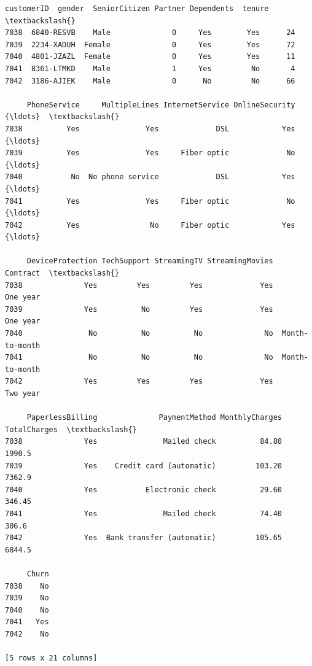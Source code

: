 \documentclass[11pt]{article}
\makeatletter
\newcommand{\boxspacing}{\kern\kvtcb@left@rule\kern\kvtcb@boxsep}
\newcommand{\prompt}[4]{
        {\ttfamily\llap{{\color{#2}[#3]:\hspace{3pt}#4}}\vspace{-\baselineskip}}
    }
\makeatother
\begin{document}
            \begin{tcolorbox}[breakable, size=fbox, boxrule=.5pt, pad at break*=1mm, opacityfill=0]
\prompt{Out}{outcolor}{184}{\boxspacing}
\begin{Verbatim}[commandchars=\\\{\}]
      customerID  gender  SeniorCitizen Partner Dependents  tenure  \textbackslash{}
7038  6840-RESVB    Male              0     Yes        Yes      24
7039  2234-XADUH  Female              0     Yes        Yes      72
7040  4801-JZAZL  Female              0     Yes        Yes      11
7041  8361-LTMKD    Male              1     Yes         No       4
7042  3186-AJIEK    Male              0      No         No      66

     PhoneService     MultipleLines InternetService OnlineSecurity  {\ldots}  \textbackslash{}
7038          Yes               Yes             DSL            Yes  {\ldots}
7039          Yes               Yes     Fiber optic             No  {\ldots}
7040           No  No phone service             DSL            Yes  {\ldots}
7041          Yes               Yes     Fiber optic             No  {\ldots}
7042          Yes                No     Fiber optic            Yes  {\ldots}

     DeviceProtection TechSupport StreamingTV StreamingMovies        Contract  \textbackslash{}
7038              Yes         Yes         Yes             Yes        One year
7039              Yes          No         Yes             Yes        One year
7040               No          No          No              No  Month-to-month
7041               No          No          No              No  Month-to-month
7042              Yes         Yes         Yes             Yes        Two year

     PaperlessBilling              PaymentMethod MonthlyCharges  TotalCharges  \textbackslash{}
7038              Yes               Mailed check          84.80        1990.5
7039              Yes    Credit card (automatic)         103.20        7362.9
7040              Yes           Electronic check          29.60        346.45
7041              Yes               Mailed check          74.40         306.6
7042              Yes  Bank transfer (automatic)         105.65        6844.5

     Churn
7038    No
7039    No
7040    No
7041   Yes
7042    No

[5 rows x 21 columns]
\end{Verbatim}
\end{tcolorbox}
        
\end{document}
